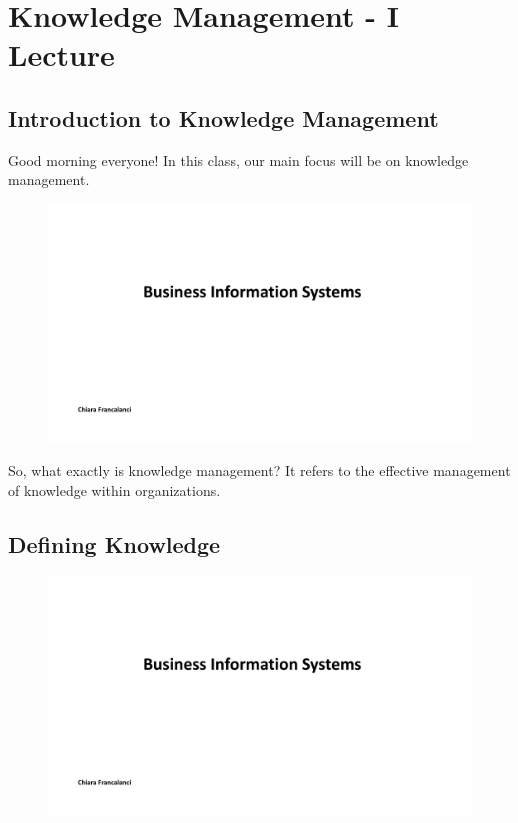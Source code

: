 \section{Knowledge Management - I Lecture}

\subsection{Introduction to Knowledge
  Management}\label{introduction-to-knowledge-management}

Good morning everyone! In this class, our main focus will be on
knowledge management.

\begin{figure}[!h]
  \centering
  \includegraphics[page=2, trim = 1.5cm 7cm 3cm 4.5cm, clip, width=\imagewidth]{images/05 - KM.pdf}
\end{figure}

So, what exactly is knowledge management? It refers to the effective
management of knowledge within organizations.

\subsection{Defining Knowledge}\label{defining-knowledge}

\begin{figure}[!h]
  \centering
  \includegraphics[page=3, trim = 1.5cm 3cm 3cm 3.5cm, clip, width=\imagewidth]{images/05 - KM.pdf}
\end{figure}

